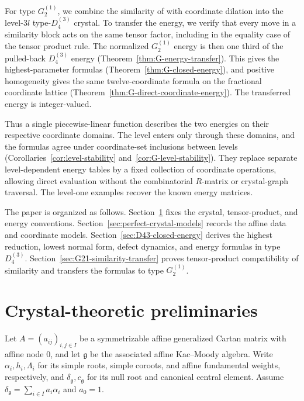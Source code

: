 \documentclass[11pt,reqno]{amsart}
\numberwithin{table}{section}
\numberwithin{equation}{section}
\theoremstyle{plain}
\theoremstyle{definition}
\begin{document}
For type \(G_2^{(1)}\), we combine the similarity of \cite{MMO} with coordinate dilation into the level-\(3l\) type-\(D_4^{(3)}\) crystal.
To transfer the energy, we verify that every move in a similarity
block acts on the same tensor factor, including in the equality
case of the tensor product rule.
The normalized \(G_2^{(1)}\) energy is then one third of the pulled-back \(D_4^{(3)}\) energy (Theorem~\ref{thm:G-energy-transfer}).
This gives the highest-parameter formulas (Theorem~\ref{thm:G-closed-energy}), and positive homogeneity gives the same twelve-coordinate formula on the fractional coordinate lattice (Theorem~\ref{thm:G-direct-coordinate-energy}).
The transferred energy is integer-valued.

Thus a single piecewise-linear function describes the two energies on their respective coordinate domains.
The level enters only through these domains, and the formulas agree under coordinate-set inclusions between levels (Corollaries~\ref{cor:level-stability} and~\ref{cor:G-level-stability}).
They replace separate level-dependent energy tables by a fixed collection of coordinate operations, allowing direct evaluation without the combinatorial \(R\)-matrix or crystal-graph traversal.
The level-one examples recover the known energy matrices.

The paper is organized as follows.
Section~\ref{sec:crystal-preliminaries} fixes the crystal, tensor-product, and energy conventions.
Section~\ref{sec:perfect-crystal-models} records the affine data and coordinate models.
Section~\ref{sec:D43-closed-energy} derives the highest reduction, lowest normal form, defect dynamics, and energy formulas in type \(D_4^{(3)}\).
Section~\ref{sec:G21-similarity-transfer} proves tensor-product compatibility of similarity and transfers the formulas to type \(G_2^{(1)}\).

\section{Crystal-theoretic preliminaries}
\label{sec:crystal-preliminaries}

Let \(A=(a_{ij})_{i,j\in I}\) be a symmetrizable affine generalized
Cartan matrix with affine node \(0\), and let \(\mathfrak g\) be
the associated affine Kac--Moody algebra.
Write \(\alpha_i,h_i,\Lambda_i\) for its simple roots, simple
coroots, and affine fundamental weights, respectively, and
\(\delta_{\mathfrak g},c_{\mathfrak g}\) for its null root and
canonical central element.
Assume $\delta_{\mathfrak g}
=
\sum_{i\in I}a_i\alpha_i$ and $a_0=1$.
\end{document}
